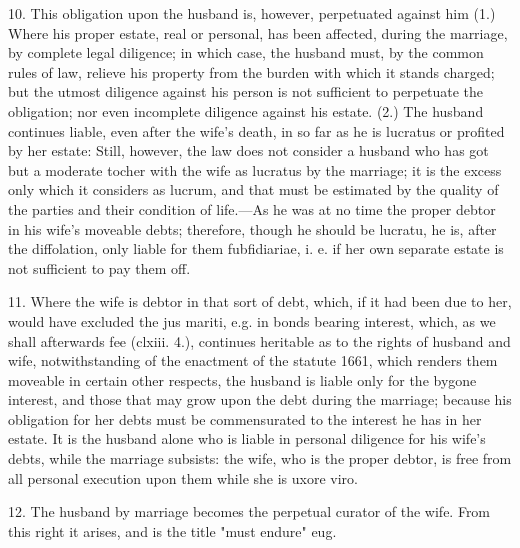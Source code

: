 \documentclass{article}
\begin{document}
10. This obligation upon the husband is, however, perpetuated against him (1.) Where his proper estate, real or personal, has been affected, during the marriage, by complete legal diligence; in which case, the husband must, by the common rules of law, relieve his property from the burden with which it stands charged; but the utmost diligence against his person is not sufficient to perpetuate the obligation; nor even incomplete diligence against his estate. (2.) The husband continues liable, even after the wife's death, in so far as he is lucratus or profited by her estate: Still, however, the law does not consider a husband who has got but a moderate tocher with the wife as lucratus by the marriage; it is the excess only which it considers as lucrum, and that must be estimated by the quality of the parties and their condition of life.—As he was at no time the proper debtor in his wife's moveable debts; therefore, though he should be lucratu, he is, after the diffolation, only liable for them fubfidiariae, i. e. if her own separate estate is not sufficient to pay them off.

11. Where the wife is debtor in that sort of debt, which, if it had been due to her, would have excluded the jus mariti, e.g. in bonds bearing interest, which, as we shall afterwards fee (clxiii. 4.), continues heritable as to the rights of husband and wife, notwithstanding of the enactment of the statute 1661, which renders them moveable in certain other respects, the husband is liable only for the bygone interest, and those that may grow upon the debt during the marriage; because his obligation for her debts must be commensurated to the interest he has in her estate. It is the husband alone who is liable in personal diligence for his wife's debts, while the marriage subsists: the wife, who is the proper debtor, is free from all personal execution upon them while she is uxore viro.

12. The husband by marriage becomes the perpetual curator of the wife. From this right it arises, and is the title "must endure" eug.
\end{document}
